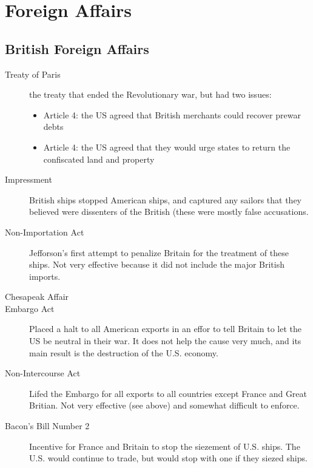 \section{Foreign Affairs}
\subsection{British Foreign Affairs}
\begin{description}
  \item[Treaty of Paris] the treaty that ended the Revolutionary war, but had two
    issues:
    \begin{itemize}
      \item Article 4: the US agreed that British merchants could recover prewar
        debts
      \item Article 4: the US agreed that they would urge states to return the
        confiscated land and property
    \end{itemize}
  \item[Impressment] British ships stopped American ships, and captured any
    sailors that they believed were dissenters of the British (these were mostly
    false accusations.
  \item[Non-Importation Act] Jefforson's first attempt to penalize Britain for
    the treatment of these ships.  Not very effective because it did not include
    the major British imports.
  \item[Chesapeak Affair]
  \item[Embargo Act] Placed a halt to all American exports in an effor to tell
    Britain to let the US be neutral in their war.  It does not help the cause
    very much, and its main result is the destruction of the U.S. economy.
  \item[Non-Intercourse Act] Lifed the Embargo for all exports to all countries
    except France and Great Britian.  Not very effective (see above) and
    somewhat difficult to enforce.
  \item[Bacon's Bill Number 2] Incentive for France and Britain to stop the
    siezement of U.S. ships.  The U.S. would continue to trade, but would stop
    with one if they siezed ships.
\end{description}

